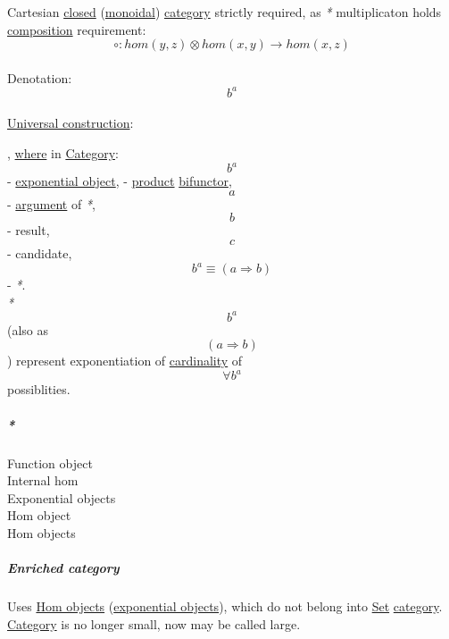 \documentclass[11pt]{article}
\begin{document}
Cartesian \hyperref[orgcdd7006]{closed} (\hyperref[orgac4647e]{monoidal}) \hyperref[org0450535]{category} strictly required, as \emph{*} multiplicaton holds \hyperref[orga128e7f]{composition} requirement:\\

$$ \circ:hom(y,z) \otimes hom(x,y) \to hom(x,z) $$\\

Denotation:\\
$$ b^{a} $$\\

\hyperref[org8221fde]{Universal construction}:\\

, \hyperref[org3e5903d]{where} in \hyperref[org0450535]{Category}: $$ b^{a} $$ - \hyperref[orge875217]{exponential object}, \texttimes{} - \hyperref[org80a0b6e]{product} \hyperref[orgfd5d693]{bifunctor}, $$ a $$ - \hyperref[orga6b7e97]{argument} of \emph{*}, $$ b $$ - result, $$ c $$ - candidate, $$ b^{a} \equiv ( a \Rightarrow b ) $$ - \emph{*}.\\

\emph{*} $$ b^{a} $$ (also as $$ (a \Rightarrow b) $$) represent exponentiation of \hyperref[org2c20526]{cardinality} of $$ \forall b^{a} $$ possiblities.\\

\subparagraph{\emph{*}}
\label{sec:org97ebacb}
\label{org14cdd29}Function object\\
\label{org3fb43c1}Internal hom\\
\label{org0e74ab1}Exponential objects\\
\label{orgc8315cf}Hom object\\
\label{orgd86d90e}Hom objects\\

\subparagraph{\label{org1bd6bdc}Enriched category}
\label{sec:org3069064}
Uses \hyperref[orgd86d90e]{Hom objects} (\hyperref[org0e74ab1]{exponential objects}), which do not belong into \hyperref[org1faf06d]{Set} \hyperref[org0450535]{category}.\\
\hyperref[org0450535]{Category} is no longer small, now may be called large.\\
\end{document}
